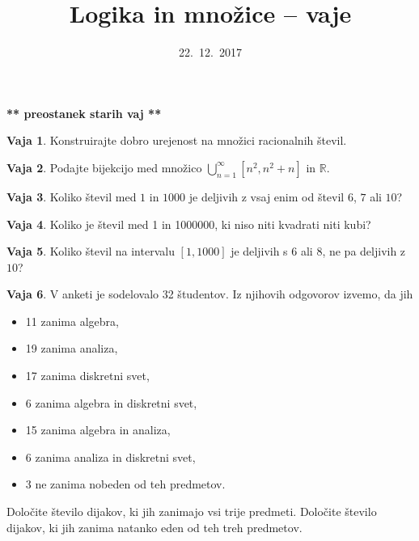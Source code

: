 \documentclass{article}
\theoremstyle{definition}
\newtheorem{vaja}{Vaja}
\begin{document}
\title{Logika in množice -- vaje}
\date{22.~12.~2017}
\maketitle

\begin{center}
\Large \textbf{** preostanek starih vaj **}
\end{center}
\bigskip

\begin{vaja}
  Konstruirajte dobro urejenost na množici racionalnih števil.
\end{vaja}

\begin{vaja}
  Podajte bijekcijo med množico $\bigcup_{n = 1}^{\infty} [n^2, n^2 + n]$ in $\mathbb{R}$.
\end{vaja}

\begin{vaja}
  Koliko števil med $1$ in $1000$ je deljivih z vsaj enim od števil $6$, $7$ ali $10$?
\end{vaja}

\begin{vaja}
  Koliko je števil med 1 in 1000000, ki niso niti kvadrati niti kubi?
\end{vaja}

\begin{vaja}
  Koliko števil na intervalu $[1, 1000]$ je deljivih s $6$ ali $8$, ne pa deljivih z $10$?
\end{vaja}

\begin{vaja}
  V anketi je sodelovalo 32 študentov. Iz njihovih odgovorov izvemo, da jih
  \begin{itemize}
    \item 11 zanima algebra,
    \item 19 zanima analiza,
    \item 17 zanima diskretni svet,
    \item 6 zanima algebra in diskretni svet,
    \item 15 zanima algebra in analiza,
    \item 6 zanima analiza in diskretni svet,
    \item 3 ne zanima nobeden od teh predmetov.
  \end{itemize}
  Določite število dijakov, ki jih zanimajo vsi trije predmeti. Določite število dijakov, ki jih zanima natanko eden od teh treh predmetov.
\end{vaja}
\end{document}
